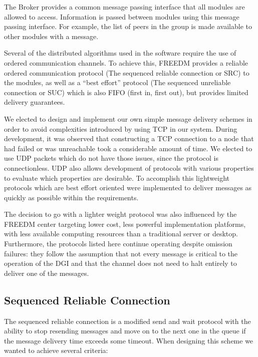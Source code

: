 The Broker provides a common message passing interface that all modules are
allowed to access. Information is passed between modules using this message
passing interface. For example, the list of peers in the group is made available
to other modules with a message. 

Several of the distributed algorithms used in the software require the use of
ordered communication channels. To achieve this, FREEDM provides a reliable
ordered communication protocol (The sequenced reliable connection or SRC) to
the modules, as well as a ``best effort'' protocol (The sequenced unreliable
connection or SUC) which is also FIFO (first in, first out), but provides
limited delivery guarantees.

We elected to design and implement our own simple message delivery schemes in
order to avoid complexities introduced by using TCP in our system. During
development, it was observed that constructing a TCP connection to a node that
had failed or was unreachable took a considerable amount of time. We elected to
use UDP packets which do not have those issues, since the protocol is
connectionless. UDP also allows development of protocols with various
properties to evaluate which properties are desirable. To accomplish this
lightweight protocols which are best effort oriented were implemented to
deliver messages as quickly as possible within the requirements.

The decision to go with a lighter weight protocol was also influenced by the
FREEDM center targeting lower cost, less powerful implementation platforms, with less
available computing resources than a traditional server or desktop.
Furthermore, the protocols listed here continue operating despite omission
failures: they follow the assumption that not every message is critical to the
operation of the DGI and that the channel does not need to halt entirely to
deliver one of the messages.

\subsection{Sequenced Reliable Connection}
The sequenced reliable connection is a modified send and wait protocol with the
ability to stop resending messages and move on to the next one in the queue if
the message delivery time exceeds some timeout. When designing this scheme we
wanted to achieve several criteria:

